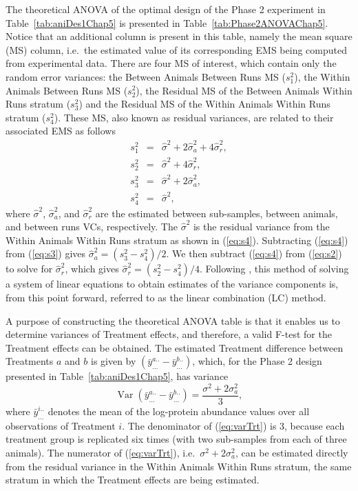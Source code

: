 The theoretical ANOVA of the optimal design of the Phase 2 experiment in Table~\ref{tab:aniDes1Chap5} is presented in Table~\ref{tab:Phase2ANOVAChap5}. Notice that an additional column is present in this table, namely the mean square (MS) column, i.e.\ the estimated value of its corresponding EMS being computed from experimental data. There are four MS of interest, which contain only the random error variances: the Between Animals Between Runs MS ($s_1^2$), the Within Animals Between Runs MS ($s_2^2$), the Residual MS of the Between Animals Within Runs stratum ($s_3^2$) and the Residual MS of the Within Animals Within Runs stratum ($s_4^2$). These MS, also known as residual variances, are related to their associated EMS as follows 
\begin{eqnarray}
\label{eq:s1} s_1^2 &=&  \hat{\sigma}^2+2\hat{\sigma}_{a}^2+4\hat{\sigma}_{r}^2,\\
\label{eq:s2} s_2^2 &=&  \hat{\sigma}^2+4\hat{\sigma}_{r}^2,\\
\label{eq:s3} s_3^2 &=&  \hat{\sigma}^2+2\hat{\sigma}_{a}^2,\\
\label{eq:s4} s_4^2 &=&  \hat{\sigma}^2,
\end{eqnarray}
where $\hat{\sigma}^2$, $\hat{\sigma}_{a}^2$, and $\hat{\sigma}_{r}^2$ are the estimated between sub-samples, between animals, and between runs VCs, respectively. The $\hat{\sigma}^2$ is the residual variance from the Within Animals Within Runs stratum as shown in (\ref{eq:s4}). Subtracting (\ref{eq:s4}) from (\ref{eq:s3}) gives $\hat{\sigma}_{a}^2 = (s_3^2 - s_4^2)/2$. We then subtract (\ref{eq:s4}) from (\ref{eq:s2}) to solve for $\hat{\sigma}_{r}^2$, which gives $\hat{\sigma}_{r}^2 = (s_2^2 - s_4^2)/4.$ Following \cite{Jarrett2008}, this method of solving a system of linear equations to obtain estimates of the variance components is, from this point forward, referred to as the linear combination (LC) method. 

A purpose of constructing the theoretical ANOVA table is that it enables us to determine variances of Treatment effects, and therefore, a valid F-test for the Treatment effects can be obtained. The estimated Treatment difference between Treatments $a$ and $b$ is given by $(\bar{y}_{...}^{a..} - \bar{y}_{...}^{b..})$, which, for the Phase 2 design presented in Table~\ref{tab:aniDes1Chap5}, has variance 
\begin{equation}\label{eq:varTrt}
\operatorname{Var}(\bar{y}_{...}^{a..} - \bar{y}_{...}^{b..}) = \dfrac{\sigma^2+2\sigma_{a}^2}{3},
\end{equation}
where $\bar{y}_{...}^{i..}$ denotes the mean of the log-protein abundance values over all observations of Treatment $i$. The denominator of (\ref{eq:varTrt}) is 3, because each treatment group is replicated six times (with two sub-samples from each of three animals). The numerator of (\ref{eq:varTrt}), i.e.\ $\sigma^2+2\sigma_{a}^2$, can be estimated directly from the residual variance in the Within Animals Within Runs stratum, the same stratum in which the Treatment effects are being estimated. 


